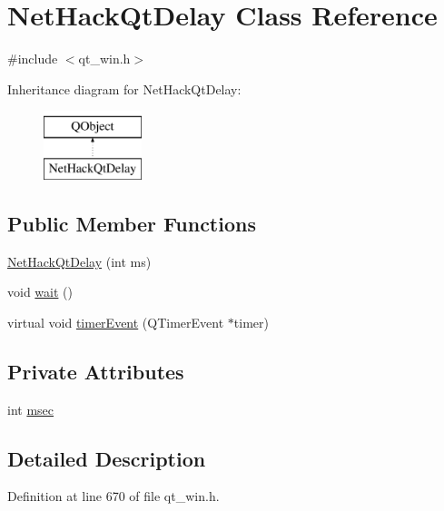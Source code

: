 \hypertarget{classNetHackQtDelay}{\section{Net\+Hack\+Qt\+Delay Class Reference}
\label{classNetHackQtDelay}
}


{\ttfamily \#include $<$qt\+\_\+win.\+h$>$}

Inheritance diagram for Net\+Hack\+Qt\+Delay\+:\begin{figure}[H]
\begin{center}
\leavevmode
\includegraphics[height=2.000000cm]{classNetHackQtDelay}
\end{center}
\end{figure}
\subsection*{Public Member Functions}
\begin{DoxyCompactItemize}
\item 
\hyperlink{classNetHackQtDelay_a74fc53b5c9ba7af76dcd827a0b88d1c7}{Net\+Hack\+Qt\+Delay} (int ms)
\item 
void \hyperlink{classNetHackQtDelay_a70aa833b5a825874cd663bd0830dc1ee}{wait} ()
\item 
virtual void \hyperlink{classNetHackQtDelay_a006345782e8abad63589c9cb70f7bac5}{timer\+Event} (Q\+Timer\+Event $\ast$timer)
\end{DoxyCompactItemize}
\subsection*{Private Attributes}
\begin{DoxyCompactItemize}
\item 
int \hyperlink{classNetHackQtDelay_a2e7d4eb0045afd5915b5e1b679935c4b}{msec}
\end{DoxyCompactItemize}


\subsection{Detailed Description}


Definition at line 670 of file qt\+\_\+win.\+h.



